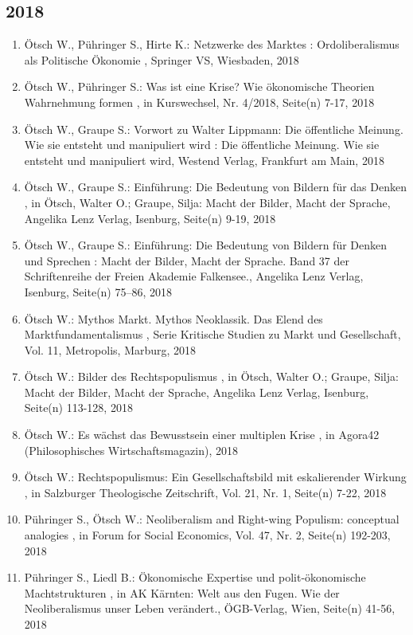  \subsection*{2018} 
 \begin{enumerate}[leftmargin=*, labelsep=0.5cm] 
	 \item Ötsch W., Pühringer S., Hirte K.:  Netzwerke des Marktes : Ordoliberalismus als Politische Ökonomie  , Springer VS, Wiesbaden, 2018
	 \item Ötsch W., Pühringer S.:  Was ist eine Krise? Wie ökonomische Theorien Wahrnehmung formen  , in Kurswechsel, Nr. 4/2018, Seite(n) 7-17, 2018
	 \item Ötsch W., Graupe S.:  Vorwort zu Walter Lippmann: Die öffentliche Meinung. Wie sie entsteht und manipuliert wird  : Die öffentliche Meinung. Wie sie entsteht und manipuliert wird, Westend Verlag, Frankfurt am Main, 2018
	 \item Ötsch W., Graupe S.:  Einführung: Die Bedeutung von Bildern für das Denken  , in Ötsch, Walter O.; Graupe, Silja: Macht der Bilder, Macht der Sprache, Angelika Lenz Verlag, Isenburg, Seite(n) 9-19, 2018
	 \item Ötsch W., Graupe S.:  Einführung: Die Bedeutung von Bildern für Denken und Sprechen  : Macht der Bilder, Macht der Sprache. Band 37 der Schriftenreihe der Freien Akademie Falkensee., Angelika Lenz Verlag, Isenburg, Seite(n) 75–86, 2018
	 \item Ötsch W.:  Mythos Markt. Mythos Neoklassik. Das Elend des Marktfundamentalismus  , Serie Kritische Studien zu Markt und Gesellschaft, Vol. 11, Metropolis, Marburg, 2018
	 \item Ötsch W.:  Bilder des Rechtspopulismus  , in Ötsch, Walter O.; Graupe, Silja: Macht der Bilder, Macht der Sprache, Angelika Lenz Verlag, Isenburg, Seite(n) 113-128, 2018
	 \item Ötsch W.:  Es wächst das Bewusstsein einer multiplen Krise  , in Agora42 (Philosophisches Wirtschaftsmagazin), 2018
	 \item Ötsch W.:  Rechtspopulismus: Ein Gesellschaftsbild mit eskalierender Wirkung  , in Salzburger Theologische Zeitschrift, Vol. 21, Nr. 1, Seite(n) 7-22, 2018
	 \item Pühringer S., Ötsch W.:  Neoliberalism and Right-wing Populism: conceptual analogies  , in Forum for Social Economics, Vol. 47, Nr. 2, Seite(n) 192-203, 2018
	 \item Pühringer S., Liedl B.:  Ökonomische Expertise und polit-ökonomische Machtstrukturen  , in AK Kärnten: Welt aus den Fugen. Wie der Neoliberalismus unser Leben verändert., ÖGB-Verlag, Wien, Seite(n) 41-56, 2018

\end{enumerate}
